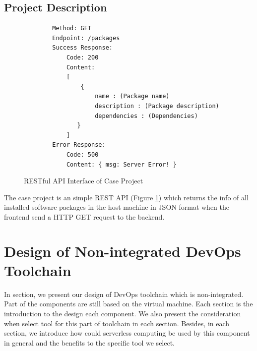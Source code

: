 \subsection{Project Description}
\begin{figure}[!h]
    \begin{verbatim}
        Method: GET
        Endpoint: /packages
        Success Response:
            Code: 200
            Content: 
            [
                {
                    name : (Package name)
                    description : (Package description)
                    dependencies : (Dependencies) 
               }
            ]
        Error Response:
            Code: 500
            Content: { msg: Server Error! }
        \end{verbatim}
        \label{fig:rest}
\caption{RESTful API Interface of Case Project}      
\end{figure}
The case project is an simple REST API (Figure \ref{fig:rest}) which returns the info of all installed software packages in the host machine in JSON format when the frontend send a HTTP GET request to the backend.
\section{Design of Non-integrated DevOps Toolchain}
In section, we present our design of  DevOps toolchain which is non-integrated. Part of the components are still based on the virtual machine. Each section is the introduction to the design each component. We also present the consideration when select tool for this part of toolchain in each section. Besides, in each section, we introduce how could serverless computing be used by this component in general and the benefits to the specific tool we select.
